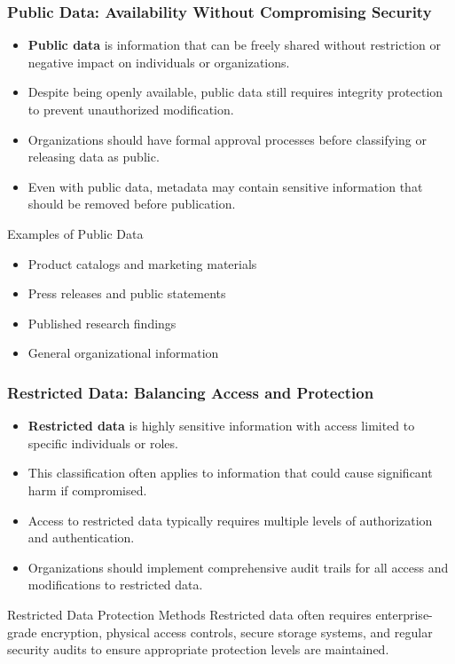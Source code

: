 \documentclass{beamer}
\begin{document}
\begin{frame}
\frametitle{Public Data: Availability Without Compromising Security}
\begin{itemize}
\item \textbf{Public data} is information that can be freely shared without restriction or negative impact on individuals or organizations.
\item Despite being openly available, public data still requires integrity protection to prevent unauthorized modification.
\item Organizations should have formal approval processes before classifying or releasing data as public.
\item Even with public data, metadata may contain sensitive information that should be removed before publication.
\end{itemize}

\begin{block}{Examples of Public Data}
\begin{itemize}
\item Product catalogs and marketing materials
\item Press releases and public statements
\item Published research findings
\item General organizational information
\end{itemize}
\end{block}
\end{frame}

\begin{frame}
\frametitle{Restricted Data: Balancing Access and Protection}
\begin{itemize}
\item \textbf{Restricted data} is highly sensitive information with access limited to specific individuals or roles.
\item This classification often applies to information that could cause significant harm if compromised.
\item Access to restricted data typically requires multiple levels of authorization and authentication.
\item Organizations should implement comprehensive audit trails for all access and modifications to restricted data.
\end{itemize}

\begin{exampleblock}{Restricted Data Protection Methods}
Restricted data often requires enterprise-grade encryption, physical access controls, secure storage systems, and regular security audits to ensure appropriate protection levels are maintained.
\end{exampleblock}
\end{frame}
\end{document}
